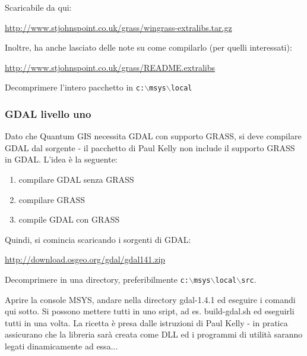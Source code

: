 Scaricabile da qui:

\url{http://www.stjohnspoint.co.uk/grass/wingrass-extralibs.tar.gz}

Inoltre, ha anche lasciato delle note su come compilarlo (per quelli interessati):

\url{http://www.stjohnspoint.co.uk/grass/README.extralibs}

Decomprimere l'intero pacchetto in \texttt{c:$\backslash$msys$\backslash$local}

\subsubsection{GDAL livello uno}
Dato che Quantum GIS necessita GDAL con supporto GRASS, si deve compilare GDAL dal sorgente - il pacchetto di Paul Kelly non include il supporto GRASS in GDAL.
L'idea è la seguente:

\begin{enumerate}
\item compilare GDAL senza GRASS
\item compilare GRASS
\item compile GDAL con GRASS
\end{enumerate}

Quindi, si comincia scaricando i sorgenti di GDAL:

\url{http://download.osgeo.org/gdal/gdal141.zip}

Decomprimere in una directory, preferibilmente \texttt{c:$\backslash$msys$\backslash$local$\backslash$src}.

Aprire la console MSYS, andare nella directory gdal-1.4.1 ed eseguire i comandi qui sotto. Si possono mettere tutti in uno sript, ad es. build-gdal.sh ed eseguirli tutti in una volta. La ricetta è presa dalle istruzioni di Paul Kelly - in pratica assicurano che la libreria sarà creata come DLL ed i programmi di utilità saranno legati dinamicamente ad essa...

